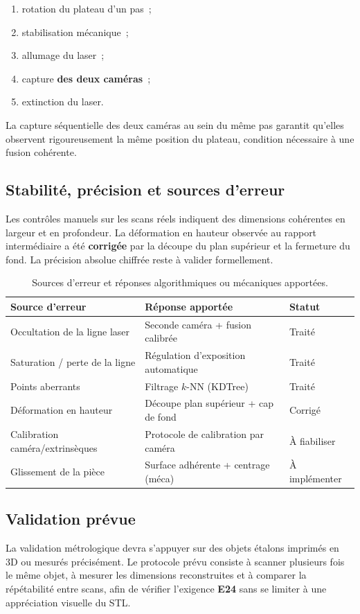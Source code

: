 \begin{enumerate}
  \item rotation du plateau d'un pas~;
  \item stabilisation mécanique~;
  \item allumage du laser~;
  \item capture \textbf{des deux caméras}~;
  \item extinction du laser.
\end{enumerate}

La capture séquentielle des deux caméras au sein du même pas garantit qu'elles
observent rigoureusement la même position du plateau, condition nécessaire à
une fusion cohérente.

\subsection{Stabilité, précision et sources d'erreur}

Les contrôles manuels sur les scans réels indiquent des dimensions cohérentes
en largeur et en profondeur. La déformation en hauteur observée au rapport
intermédiaire a été \textbf{corrigée} par la découpe du plan supérieur et la
fermeture du fond. La précision absolue chiffrée reste à valider formellement.

\begin{table}[H]
  \centering
  \begin{tabular}{@{}p{4.8cm}p{4cm}p{4.5cm}@{}}
    \toprule
    \textbf{Source d'erreur} & \textbf{Réponse apportée} & \textbf{Statut} \\
    \midrule
    Occultation de la ligne laser & Seconde caméra + fusion calibrée & Traité \\
    Saturation / perte de la ligne & Régulation d'exposition automatique & Traité \\
    Points aberrants & Filtrage $k$-NN (KDTree) & Traité \\
    Déformation en hauteur & Découpe plan supérieur + cap de fond & Corrigé \\
    Calibration caméra/extrinsèques & Protocole de calibration par caméra & À fiabiliser \\
    Glissement de la pièce & Surface adhérente + centrage (méca) & À implémenter \\
    \bottomrule
  \end{tabular}
  \caption{Sources d'erreur et réponses algorithmiques ou mécaniques apportées.}
  \label{tab:erreurs}
\end{table}

\subsection{Validation prévue}

La validation métrologique devra s'appuyer sur des objets étalons imprimés en
3D ou mesurés précisément. Le protocole prévu consiste à scanner plusieurs fois
le même objet, à mesurer les dimensions reconstruites et à comparer la
répétabilité entre scans, afin de vérifier l'exigence \textbf{E24} sans se
limiter à une appréciation visuelle du STL.

